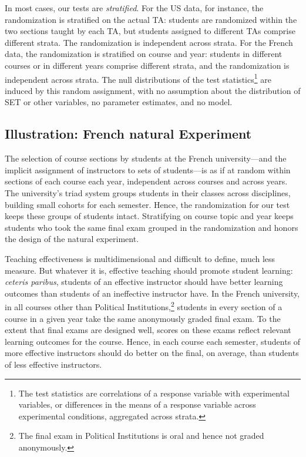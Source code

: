 \documentclass[12pt]{article}
\begin{document}
In most cases, our tests are \emph{stratified}.
For the US data, for instance, the randomization is stratified on the actual TA:
students are randomized within the two sections taught by each TA,
but students assigned to different TAs comprise different strata.
The randomization is independent across strata.
For the French data, the randomization is stratified on course and year:
students in different courses or in different years comprise different strata,
and the randomization is independent across strata.
The null distributions of the test statistics\footnote{%
 The test statistics are correlations of a response variable with experimental variables,
 or differences in the means of a response variable across experimental
 conditions, aggregated across strata.
}
are induced by this random
assignment, with no assumption about the distribution of SET or other variables, 
no parameter estimates, and no model.

\subsection{Illustration: French natural Experiment} \label{sec:boringMethods}
The selection of course sections by students at the French university---and the implicit 
assignment of instructors to sets of students---is as if at random within sections of each
course each year, independent across courses and across years.
The university's triad system groups students in their classes across disciplines,
building small cohorts for each semester.
Hence, the randomization for our test keeps these groups of students intact.
Stratifying on course topic and year keeps students who took the same final
exam grouped in the randomization and honors the design of the natural experiment.

Teaching effectiveness is multidimensional \citep{Marsh1997} and difficult to define,
much less measure. 
But whatever it is, effective teaching should promote student learning:
\emph{ceteris paribus},
students of an effective instructor should have better learning outcomes
than students of an ineffective instructor have.
In the French university, in all courses other than Political Institutions,\footnote{%
 The final exam in Political Institutions is oral and hence not graded anonymously.
}
students in every section of a course in a given year take the same anonymously graded
final exam.
To the extent that final exams are designed well, scores on these exams reflect relevant 
learning outcomes for the course.
Hence, in each course each semester, students of more effective instructors should do better 
on the final, on average, than students of less effective instructors.
\end{document}
